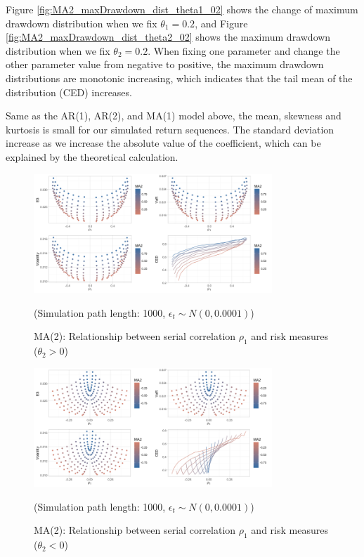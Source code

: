 \documentclass[11pt]{article}
\begin{document}
Figure \ref{fig:MA2_maxDrawdown_dist_theta1_02} shows the change of maximum drawdown distribution when we fix $\theta_1=0.2$, and Figure \ref{fig:MA2_maxDrawdown_dist_theta2_02} shows the maximum drawdown distribution when we fix $\theta_2=0.2$. When fixing one parameter and change the other parameter value from negative to positive, the maximum drawdown distributions are monotonic increasing, which indicates that the tail mean of the distribution (CED) increases.

Same as the AR(1), AR(2), and MA(1) model above, the mean, skewness and kurtosis is small for our simulated return sequences. The standard deviation increase as we increase the absolute value of the coefficient, which can be explained by the theoretical calculation.

\begin{figure}[H]
\centering
\includegraphics[width = 0.8\textwidth]{../figures/simulation/MA2_risk_measures_pos}
\caption{MA(2): Relationship between serial correlation $\rho_1$ and risk measures ($\theta_2>0$)}
(Simulation path length: 1000, $\epsilon_t \sim N(0, 0.0001)$)
\label{fig:MA2_risk_measures_pos}
\end{figure}

\begin{figure}[H]
\centering
\includegraphics[width = 0.8\textwidth]{../figures/simulation/MA2_risk_measures_neg}
\caption{MA(2): Relationship between serial correlation $\rho_1$ and risk measures ($\theta_2<0$)}
(Simulation path length: 1000, $\epsilon_t \sim N(0, 0.0001)$)
\label{fig:MA2_risk_measures_neg}
\end{figure}
\end{document}
